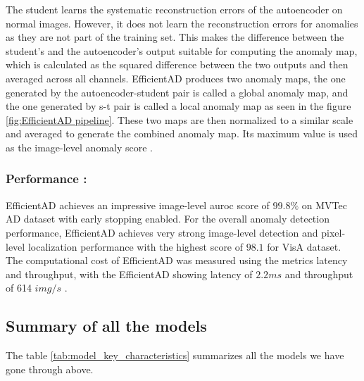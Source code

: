 The student learns the systematic reconstruction errors of the autoencoder on normal images. However, it does not learn the reconstruction errors for anomalies as they are not part of the training set. This makes the difference between the student's and the autoencoder's output suitable for computing the anomaly map, which is calculated as the squared difference between the two outputs and then averaged across all channels. EfficientAD produces two anomaly maps, the one generated by the autoencoder-student pair is called a global anomaly map, and the one generated by \gls{s-t} pair is called a local anomaly map as seen in the figure \ref{fig:EfficientAD pipeline}. These two maps are then normalized to a similar scale and averaged to generate the combined anomaly map. Its maximum value is used as the image-level anomaly score \cite{batzner2024efficientadaccuratevisualanomaly}.

\subsubsection*{Performance :}

EfficientAD achieves an impressive image-level \gls{auroc} score of $99.8\%$ on MVTec AD dataset\cite{8954181} with early stopping enabled. For the overall anomaly detection performance, EfficientAD achieves very strong image-level detection and pixel-level localization performance with the highest score of $98.1$ for VisA\cite{zou2022spotthedifferenceselfsupervisedpretraininganomaly} dataset. The computational cost of EfficientAD was measured using the metrics latency and throughput, with the EfficientAD showing latency of $2.2ms$ and throughput of 614 $img/s$ \cite{batzner2024efficientadaccuratevisualanomaly}.

\subsection*{Summary of all the models}

The table \ref{tab:model_key_characteristics} summarizes all the models we have gone through above.

